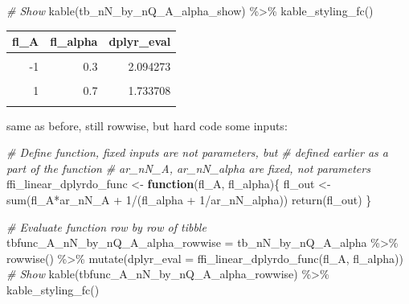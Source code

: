 \documentclass[
]{book}
\newenvironment{Shaded}{\begin{snugshade}}{\end{snugshade}}
\newcommand{\AttributeTok}[1]{\textcolor[rgb]{0.77,0.63,0.00}{#1}}
\newcommand{\CommentTok}[1]{\textcolor[rgb]{0.56,0.35,0.01}{\textit{#1}}}
\newcommand{\ControlFlowTok}[1]{\textcolor[rgb]{0.13,0.29,0.53}{\textbf{#1}}}
\newcommand{\DecValTok}[1]{\textcolor[rgb]{0.00,0.00,0.81}{#1}}
\newcommand{\FunctionTok}[1]{\textcolor[rgb]{0.00,0.00,0.00}{#1}}
\newcommand{\NormalTok}[1]{#1}
\newcommand{\OtherTok}[1]{\textcolor[rgb]{0.56,0.35,0.01}{#1}}
\newcommand{\SpecialCharTok}[1]{\textcolor[rgb]{0.00,0.00,0.00}{#1}}
\begin{document}
\begin{Shaded}
\begin{Highlighting}[]
\CommentTok{\# Show}
\FunctionTok{kable}\NormalTok{(tb\_nN\_by\_nQ\_A\_alpha\_show) }\SpecialCharTok{\%\textgreater{}\%}
  \FunctionTok{kable\_styling\_fc}\NormalTok{()}
\end{Highlighting}
\end{Shaded}

\begin{table}[!h]
\centering
\begin{tabular}{r|r|r}
\hline
fl\_A & fl\_alpha & dplyr\_eval\\
\hline
\cellcolor{gray!6}{-2} & \cellcolor{gray!6}{0.1} & \cellcolor{gray!6}{2.346356}\\
\hline
-1 & 0.3 & 2.094273\\
\hline
\cellcolor{gray!6}{0} & \cellcolor{gray!6}{0.5} & \cellcolor{gray!6}{1.895316}\\
\hline
1 & 0.7 & 1.733708\\
\hline
\cellcolor{gray!6}{2} & \cellcolor{gray!6}{0.9} & \cellcolor{gray!6}{1.599477}\\
\hline
\end{tabular}
\end{table}

same as before, still rowwise, but hard code some inputs:

\begin{Shaded}
\begin{Highlighting}[]
\CommentTok{\# Define function, fixed inputs are not parameters, but}
\CommentTok{\# defined earlier as a part of the function}
\CommentTok{\# ar\_nN\_A, ar\_nN\_alpha are fixed, not parameters}
\NormalTok{ffi\_linear\_dplyrdo\_func }\OtherTok{\textless{}{-}} \ControlFlowTok{function}\NormalTok{(fl\_A, fl\_alpha)\{}
\NormalTok{  fl\_out }\OtherTok{\textless{}{-}} \FunctionTok{sum}\NormalTok{(fl\_A}\SpecialCharTok{*}\NormalTok{ar\_nN\_A }\SpecialCharTok{+} \DecValTok{1}\SpecialCharTok{/}\NormalTok{(fl\_alpha }\SpecialCharTok{+} \DecValTok{1}\SpecialCharTok{/}\NormalTok{ar\_nN\_alpha))}
  \FunctionTok{return}\NormalTok{(fl\_out)}
\NormalTok{\}}

\CommentTok{\# Evaluate function row by row of tibble}
\NormalTok{tbfunc\_A\_nN\_by\_nQ\_A\_alpha\_rowwise }\OtherTok{=}\NormalTok{ tb\_nN\_by\_nQ\_A\_alpha }\SpecialCharTok{\%\textgreater{}\%} \FunctionTok{rowwise}\NormalTok{() }\SpecialCharTok{\%\textgreater{}\%}
  \FunctionTok{mutate}\NormalTok{(}\AttributeTok{dplyr\_eval =} \FunctionTok{ffi\_linear\_dplyrdo\_func}\NormalTok{(fl\_A, fl\_alpha))}
\CommentTok{\# Show}
\FunctionTok{kable}\NormalTok{(tbfunc\_A\_nN\_by\_nQ\_A\_alpha\_rowwise) }\SpecialCharTok{\%\textgreater{}\%}
  \FunctionTok{kable\_styling\_fc}\NormalTok{()}
\end{Highlighting}
\end{Shaded}
\end{document}
